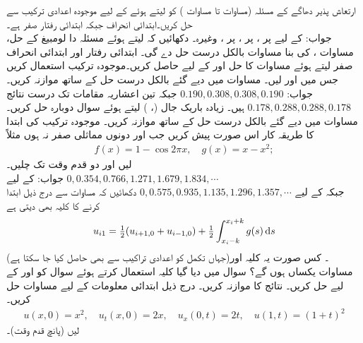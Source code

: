 \quad
ارتعاش پذیر دھاگے کے مسئلہ (مساوات  تا مساوات ) کو  لیتے ہوئے  کے لیے موجودہ اعدادی ترکیب سے حل کریں۔ابتدائی انحراف جبکہ ابتدائی رفتار صفر ہے۔\\
جواب:\quad
{} کے لیے  پر ،  پر ،  پر ، وغیرہ۔
\quad
دکھائیں کہ  لیتے ہوئے  مسئلہ دا لومبیغ  کے حل، مساوات ، کی بنا مساوات  بالکل درست حل  دے گی۔
\quad
ابتدائی رفتار  اور ابتدائی انحراف صفر  لیتے ہوئے مساوات  کا حل  اور  کے لیے حاصل کریں۔موجودہ ترکیب استعمال کریں جس میں  اور  لیں۔ مساوات  میں دیے گئے بالکل درست حل کے ساتھ موازنہ کریں۔\\
جواب:\quad
$0.190,0.308,0.308,0.190$ 
جبکہ تین اعشاریہ مقامات تک درست نتائج 
$0.178,0.288,0.288,0.178$
ہیں۔
\quad
زیادہ باریک جال (، ) لیتے ہوئے سوال  دوبارہ حل کریں۔مساوات  میں دیے گئے بالکل درست حل کے ساتھ موازنہ کریں۔
\quad
موجودہ ترکیب کی ابتدا کا طریقہ کار اس صورت پیش کریں جب  اور  دونوں مماثلی صفر نہ ہوں مثلاً
\begin{align*}
f(x)=1-\cos 2\pi x,\quad g(x)=x-x^2;
\end{align*} 
 لیں اور دو قدم وقت تک چلیں۔\\
جواب:\quad
{} کے لیے
$0,0.354,0.766,1.271,1.679,1.834,\cdots$\\
جبکہ  کے لیے
$0,0.575,0.935,1.135,1.296,1.357,\cdots$ 
\quad
دکھائیں کہ مساوات  سے درج ذیل ابتدا کرنے کا کلیہ بھی دیتی ہے
\begin{align*}
u_{i1}=\tfrac{1}{2}(u_{i+1,0}+u_{i-1,0})+\tfrac{1}{2}\int_{x_i-k}^{x_i+k}g(s)\dif s
\end{align*}
(جہاں تکمل کو اعدادی تراکیب سے بھی حاصل کیا جا سکتا ہے)۔ کس صورت یہ کلیہ اور مساوات  یکساں ہوں گے؟
\quad
سوال  میں دیا گیا کلیہ استعمال کرتے ہوئے سوال  کو   اور  کے لیے حل کریں۔ نتائج کا موازنہ کریں۔
\quad
درج ذیل ابتدائی معلومات کے لیے مساوات  حل کریں۔
\begin{align*}
u(x,0)=x^2,\quad u_t(x,0)=2x,\quad u_x(0,t)=2t,\quad u(1,t)=(1+t)^2
\end{align*}
 لیں (پانچ قدم وقت)۔

